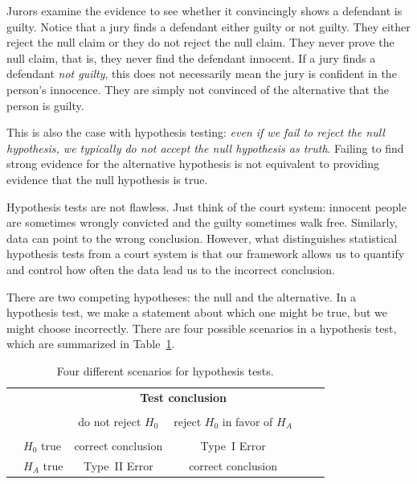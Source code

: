 Jurors examine the evidence to see whether it convincingly shows a defendant is guilty. Notice that a jury finds a defendant either guilty or not guilty. They either reject the null claim or they do not reject the null claim. They never prove the null claim, that is, they never find the defendant innocent. If a jury finds a defendant \emph{not guilty}, this does not necessarily mean the jury is confident in the person's innocence. They are simply not convinced of the alternative that the person is guilty.

This is also the case with hypothesis testing: \emph{even if we fail to reject the null hypothesis, we typically do not accept the null hypothesis as truth}. Failing to find strong evidence for the alternative hypothesis is not equivalent to providing evidence that the null hypothesis is true.


Hypothesis tests are not flawless. Just think of the court system: innocent people are sometimes wrongly convicted and the guilty sometimes walk free. Similarly, data can point to the wrong conclusion. However, what distinguishes statistical hypothesis tests from a court system is that our framework allows us to quantify and control how often the data lead us to the incorrect conclusion.

There are two competing hypotheses: the null and the alternative. In a hypothesis test, we make a statement about which one might be true, but we might choose incorrectly. There are four possible scenarios in a hypothesis test, which are summarized in Table~\ref{fourHTScenarios}.

\begin{table}[ht]
\centering
\begin{tabular}{l l c c c}
& & \multicolumn{2}{c}{\textbf{Test conclusion}} \\
  \cline{3-4}
\vspace{-3.7mm} \\
& & do not reject $H_0$ &  reject $H_0$ in favor of $H_A$ &
\ \hspace{7mm} \  \\
  \cline{2-4}
\vspace{-3.7mm} \\
& $H_0$ true & correct conclusion &  Type~I Error \\
\raisebox{1.5ex}{\textbf{Truth}} & $H_A$ true & Type~II Error & correct conclusion \\
  \cline{2-4}
\end{tabular}
\caption{Four different scenarios for hypothesis tests.}
\label{fourHTScenarios}
\end{table}

